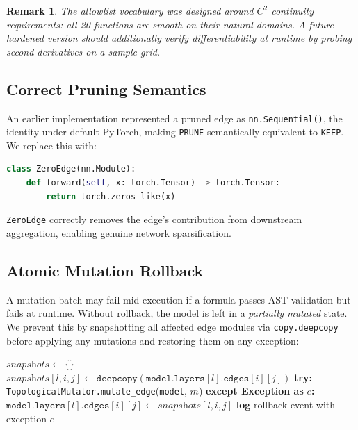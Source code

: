 \documentclass[11pt,a4paper]{article}
\newtheorem{remark}{Remark}
\begin{document}
\begin{remark}
The allowlist vocabulary was designed around $C^2$ continuity requirements: all 20
functions are smooth on their natural domains. A future hardened version should
additionally verify differentiability at runtime by probing second derivatives on a
sample grid.
\end{remark}

\subsection{Correct Pruning Semantics}

An earlier implementation represented a pruned edge as \texttt{nn.Sequential()}, the
identity under default PyTorch, making \texttt{PRUNE} semantically equivalent to
\texttt{KEEP}. We replace this with:

\begin{lstlisting}[language=Python]
class ZeroEdge(nn.Module):
    def forward(self, x: torch.Tensor) -> torch.Tensor:
        return torch.zeros_like(x)
\end{lstlisting}

\texttt{ZeroEdge} correctly removes the edge's contribution from downstream aggregation,
enabling genuine network sparsification.

\subsection{Atomic Mutation Rollback}

A mutation batch may fail mid-execution if a formula passes AST validation but fails at
runtime. Without rollback, the model is left in a \emph{partially mutated} state. We
prevent this by snapshotting all affected edge modules via \texttt{copy.deepcopy}
before applying any mutations and restoring them on any exception:

\begin{algorithm}
\caption{Atomic Mutation Application with Rollback}
\begin{algorithmic}[1]
\State $\textit{snapshots} \leftarrow \{\}$
    \State $\textit{snapshots}[l,i,j] \leftarrow \texttt{deepcopy}(\texttt{model.layers}[l].\texttt{edges}[i][j])$
\EndFor
\State \textbf{try:}
    \State \texttt{TopologicalMutator.mutate\_edge}(\texttt{model}, $m$)
\EndFor
\State \textbf{except Exception as} $e$\textbf{:}
    \State $\texttt{model.layers}[l].\texttt{edges}[i][j] \leftarrow \textit{snapshots}[l,i,j]$
\EndFor
\State \textbf{log} rollback event with exception $e$
\end{algorithmic}
\end{algorithm}
\end{document}
